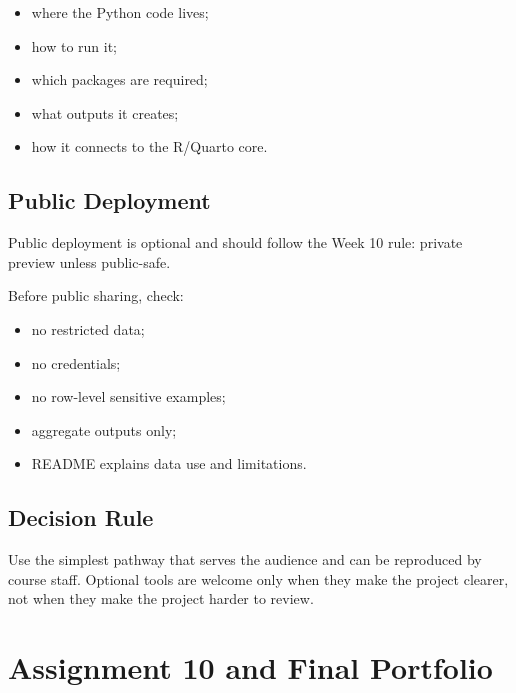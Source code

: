 \documentclass[
  letterpaper,
  DIV=11,
  numbers=noendperiod,
  oneside]{scrreprt}
\providecommand{\tightlist}{%
  \setlength{\itemsep}{0pt}\setlength{\parskip}{0pt}}
\begin{document}
\begin{itemize}
\tightlist
\item
  where the Python code lives;
\item
  how to run it;
\item
  which packages are required;
\item
  what outputs it creates;
\item
  how it connects to the R/Quarto core.
\end{itemize}

\section*{Public Deployment}\label{public-deployment}


Public deployment is optional and should follow the Week 10 rule:
private preview unless public-safe.

Before public sharing, check:

\begin{itemize}
\tightlist
\item
  no restricted data;
\item
  no credentials;
\item
  no row-level sensitive examples;
\item
  aggregate outputs only;
\item
  README explains data use and limitations.
\end{itemize}

\section*{Decision Rule}\label{decision-rule}


Use the simplest pathway that serves the audience and can be reproduced
by course staff. Optional tools are welcome only when they make the
project clearer, not when they make the project harder to review.

\chapter*{Assignment 10 and Final
Portfolio}\label{assignment-10-and-final-portfolio}
\end{document}
